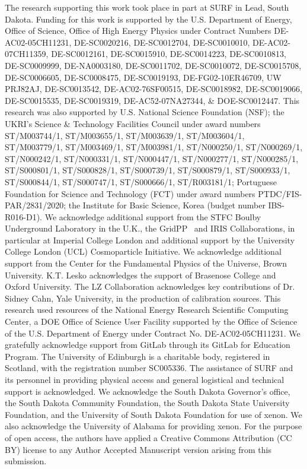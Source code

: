 \documentclass[reprint, showpacs,
preprintnumbers,
amsmath,amssymb,
aps, floatfix,
superscriptaddress,
prd, nofootinbib]{revtex4-1}
\begin{document}
\begin{acknowledgments}
The research supporting this work took place in part at SURF in Lead, South Dakota. Funding for this work is supported by the U.S. Department of Energy, Office of Science, Office of High Energy Physics under Contract Numbers DE-AC02-05CH11231, DE-SC0020216, DE-SC0012704, DE-SC0010010, DE-AC02-07CH11359, DE-SC0012161, DE-SC0015910, DE-SC0014223, DE-SC0010813, DE-SC0009999, DE-NA0003180, DE-SC0011702, DE-SC0010072, DE-SC0015708, DE-SC0006605, DE-SC0008475, DE-SC0019193, DE-FG02-10ER46709, UW PRJ82AJ, DE-SC0013542, DE-AC02-76SF00515, DE-SC0018982, DE-SC0019066, DE-SC0015535, DE-SC0019319, DE-AC52-07NA27344, \& DOE-SC0012447.
This research was also supported by U.S. National Science Foundation (NSF); the UKRI’s Science \& Technology Facilities Council under award numbers ST/M003744/1, ST/M003655/1, ST/M003639/1, ST/M003604/1, ST/M003779/1, ST/M003469/1, ST/M003981/1, ST/N000250/1, ST/N000269/1, ST/N000242/1, ST/N000331/1, ST/N000447/1, ST/N000277/1, ST/N000285/1, ST/S000801/1, ST/S000828/1, ST/S000739/1, ST/S000879/1, ST/S000933/1, ST/S000844/1, ST/S000747/1, ST/S000666/1, ST/R003181/1; Portuguese Foundation for Science and Technology (FCT) under award numbers PTDC/FIS-PAR/2831/2020; the Institute for Basic Science, Korea (budget number IBS-R016-D1). 
We acknowledge additional support from the STFC Boulby Underground Laboratory in the U.K., the GridPP~\cite{faulkner2005gridpp,britton2009gridpp} and IRIS Collaborations, in particular at Imperial College London and additional support by the University College London (UCL) Cosmoparticle Initiative. 
We acknowledge additional support from the Center for the Fundamental Physics of the Universe, Brown University. 
K.T. Lesko acknowledges the support of Brasenose College and Oxford University. The LZ Collaboration acknowledges key contributions of Dr. Sidney Cahn, Yale University, in the production of calibration sources. 
This research used resources of the National Energy Research Scientific Computing Center, a DOE Office of Science User Facility supported by the Office of Science of the U.S. Department of Energy under Contract No. DE-AC02-05CH11231. We gratefully acknowledge support from GitLab through its GitLab for Education Program. 
The University of Edinburgh is a charitable body, registered in Scotland, with the registration number SC005336. 
The assistance of SURF and its personnel in providing physical access and general logistical and technical support is acknowledged. We acknowledge the South Dakota Governor's office, the South Dakota Community Foundation, the South Dakota State University Foundation, and the University of South Dakota Foundation for use of xenon.
We also acknowledge the University of Alabama for providing xenon.
For the purpose of open access, the authors have applied a Creative Commons Attribution (CC BY) license to any Author Accepted Manuscript version arising from this submission.
\end{acknowledgments}
\end{document}
